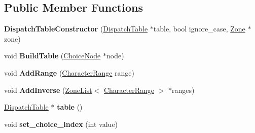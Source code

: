 \subsection*{Public Member Functions}
\begin{DoxyCompactItemize}
\item 
\hypertarget{classv8_1_1internal_1_1_dispatch_table_constructor_a6b77a705962e90834c94f3bb955c13e0}{}{\bfseries Dispatch\+Table\+Constructor} (\hyperlink{classv8_1_1internal_1_1_dispatch_table}{Dispatch\+Table} $\ast$table, bool ignore\+\_\+case, \hyperlink{classv8_1_1internal_1_1_zone}{Zone} $\ast$zone)\label{classv8_1_1internal_1_1_dispatch_table_constructor_a6b77a705962e90834c94f3bb955c13e0}

\item 
\hypertarget{classv8_1_1internal_1_1_dispatch_table_constructor_a1b76a50e582a68e269cb890eedf6d589}{}void {\bfseries Build\+Table} (\hyperlink{classv8_1_1internal_1_1_choice_node}{Choice\+Node} $\ast$node)\label{classv8_1_1internal_1_1_dispatch_table_constructor_a1b76a50e582a68e269cb890eedf6d589}

\item 
\hypertarget{classv8_1_1internal_1_1_dispatch_table_constructor_a1548155ab04ff6b6e9dd66604dedb40d}{}void {\bfseries Add\+Range} (\hyperlink{classv8_1_1internal_1_1_character_range}{Character\+Range} range)\label{classv8_1_1internal_1_1_dispatch_table_constructor_a1548155ab04ff6b6e9dd66604dedb40d}

\item 
\hypertarget{classv8_1_1internal_1_1_dispatch_table_constructor_af12d73b2803161628f8a173f2c659b03}{}void {\bfseries Add\+Inverse} (\hyperlink{classv8_1_1internal_1_1_zone_list}{Zone\+List}$<$ \hyperlink{classv8_1_1internal_1_1_character_range}{Character\+Range} $>$ $\ast$ranges)\label{classv8_1_1internal_1_1_dispatch_table_constructor_af12d73b2803161628f8a173f2c659b03}

\item 
\hypertarget{classv8_1_1internal_1_1_dispatch_table_constructor_a77523bbe347cbbbead2638b05779bf8c}{}\hyperlink{classv8_1_1internal_1_1_dispatch_table}{Dispatch\+Table} $\ast$ {\bfseries table} ()\label{classv8_1_1internal_1_1_dispatch_table_constructor_a77523bbe347cbbbead2638b05779bf8c}

\item 
\hypertarget{classv8_1_1internal_1_1_dispatch_table_constructor_af140ecca6eb06039a4a4b25f93a3379e}{}void {\bfseries set\+\_\+choice\+\_\+index} (int value)\label{classv8_1_1internal_1_1_dispatch_table_constructor_af140ecca6eb06039a4a4b25f93a3379e}

\end{DoxyCompactItemize}
